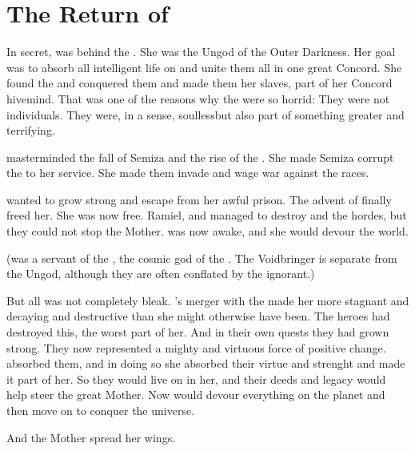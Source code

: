 \section[The Return of Tyrasshana]{The Return of \Tiamat}
In secret, \Tiamat was behind the \resphain. 
She was the Ungod of the Outer Darkness.
Her goal was to absorb all intelligent life on \Miith and unite them all in one great Concord. 
She found the \banes and conquered them and made them her slaves, part of her Concord hivemind. 
That was one of the reasons why the \banes were so horrid: 
They were not individuals. 
They were, in a sense, soulless\dash but also part of something greater and terrifying. 

\Tiamat masterminded the fall of Semiza and the rise of the \resphain.
She made Semiza corrupt the \resphain to her service. 
She made them invade \Miith and wage war against the \ophidian races. 

\Tiamat wanted to grow strong and escape from her awful prison. 
The advent of \Lithrim finally freed her. 
She was now free. 
Ramiel, \Azeraid and \Iscrafel managed to destroy \Daggerrain and the \bane hordes, but they could not stop the Mother. 
\Tiamat was now awake, and she would devour the world. 

(\Daggerrain was a servant of the , the cosmic god of the \banes. 
The Voidbringer is separate from the Ungod, although they are often conflated by the ignorant.)

But all was not completely bleak. 
\Tiamat's merger with the \banes made her more stagnant and decaying and destructive than she might otherwise have been.
The heroes had destroyed this, the worst part of her. 
And in their own quests they had grown strong.
They now represented a mighty and virtuous force of positive change. 
\Tiamat absorbed them, and in doing so she absorbed their virtue and strenght and made it part of her.
So they would live on in her, and their deeds and legacy would help steer the great Mother. 
Now \Tiamat would devour everything on the planet and then move on to conquer the universe. 

And the Mother spread her wings. 





















